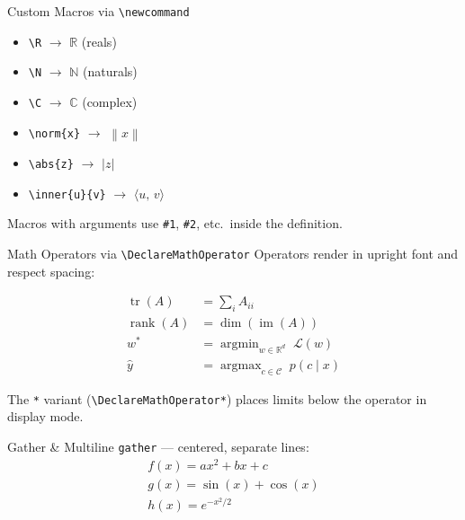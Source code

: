 \documentclass[aspectratio=169]{beamer}
\newcommand{\R}{\mathbb{R}}
\newcommand{\N}{\mathbb{N}}
\newcommand{\C}{\mathbb{C}}
\newcommand{\norm}[1]{\left\lVert #1 \right\rVert}
\newcommand{\abs}[1]{\left| #1 \right|}
\newcommand{\inner}[2]{\langle #1,\, #2 \rangle}
\DeclareMathOperator{\tr}{tr}
\DeclareMathOperator{\rank}{rank}
\DeclareMathOperator*{\argmax}{argmax}
\DeclareMathOperator*{\argmin}{argmin}
\begin{document}
\begin{frame}{Custom Macros via \texttt{\textbackslash newcommand}}
  \begin{itemize}
    \item \texttt{\textbackslash R} $\to$ $\R$ \quad (reals)
    \item \texttt{\textbackslash N} $\to$ $\N$ \quad (naturals)
    \item \texttt{\textbackslash C} $\to$ $\C$ \quad (complex)
    \item \texttt{\textbackslash norm\{x\}} $\to$ $\norm{x}$
    \item \texttt{\textbackslash abs\{z\}} $\to$ $\abs{z}$
    \item \texttt{\textbackslash inner\{u\}\{v\}} $\to$ $\inner{u}{v}$
  \end{itemize}

  \bigskip

  Macros with arguments use \texttt{\#1}, \texttt{\#2}, etc.\ inside the definition.
\end{frame}


\begin{frame}{Math Operators via \texttt{\textbackslash DeclareMathOperator}}
  Operators render in upright font and respect spacing:

  \begin{align*}
    \tr(A)    &= \sum_i A_{ii}                                              \\
    \rank(A)  &= \dim(\operatorname{im}(A))                                 \\
    w^*       &= \argmin_{w \in \R^d} \; \mathcal{L}(w)                    \\
    \hat{y}   &= \argmax_{c \in \mathcal{C}} \; p(c \mid x)
  \end{align*}

  \bigskip

  The \texttt{*} variant (\texttt{\textbackslash DeclareMathOperator*}) places limits
  below the operator in display mode.
\end{frame}


\begin{frame}{Gather \& Multiline}
  \texttt{gather} — centered, separate lines:
  \begin{gather*}
    f(x) = ax^2 + bx + c \\
    g(x) = \sin(x) + \cos(x) \\
    h(x) = e^{-x^2/2}
  \end{gather*}
\end{frame}
\end{document}
